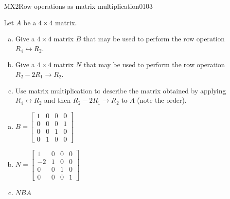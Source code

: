 \begin{exercise}{MX2}{Row operations as matrix multiplication}{0103} 
\begin{exerciseStatement} 

Let \(A\) be a \(4 \times 4\) matrix.

 

\begin{enumerate}[(a)]
\item Give a \(4 \times 4\) matrix \(B\) that may be used to perform the row operation \(R_4 \leftrightarrow R_2\).
\item Give a \(4 \times 4\) matrix \(N\) that may be used to perform the row operation \(R_2 - 2 R_1 \to R_2\).
\item Use matrix multiplication to describe the matrix obtained by applying \(R_4 \leftrightarrow R_2\) and then \(R_2 - 2 R_1 \to R_2\) to \(A\) (note the order). 
\end{enumerate}

     \end{exerciseStatement}
 \begin{exerciseAnswer} 

\begin{enumerate}[(a)]
\item \(B=\left[\begin{array}{cccc}
1 & 0 & 0 & 0 \\
0 & 0 & 0 & 1 \\
0 & 0 & 1 & 0 \\
0 & 1 & 0 & 0
\end{array}\right]\)
\item \(N=\left[\begin{array}{cccc}
1 & 0 & 0 & 0 \\
-2 & 1 & 0 & 0 \\
0 & 0 & 1 & 0 \\
0 & 0 & 0 & 1
\end{array}\right]\)
\item  \(NBA\) 
\end{enumerate}

     \end{exerciseAnswer}
 \end{exercise}


\newpage




